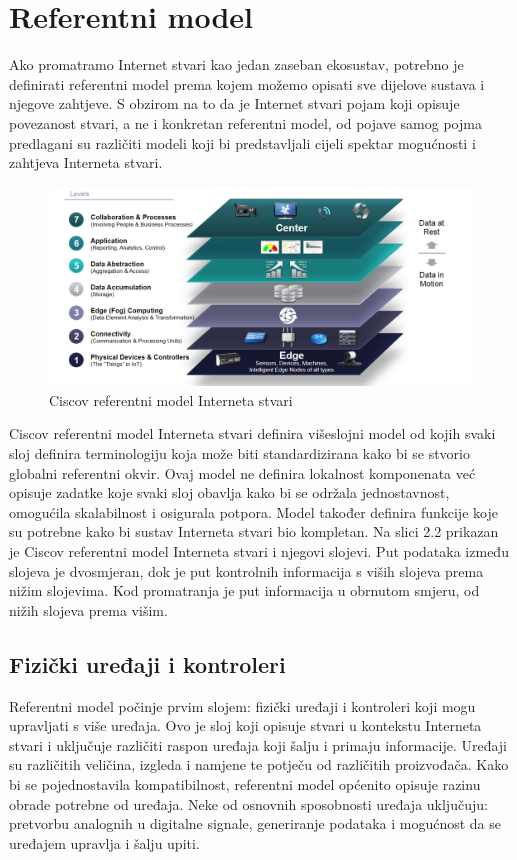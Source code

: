 \documentclass[times, utf8, diplomski]{fer}
\begin{document}
\section{Referentni model}
Ako promatramo Internet stvari kao jedan zaseban ekosustav, potrebno je definirati referentni model prema kojem možemo opisati sve dijelove sustava i njegove zahtjeve. S obzirom na to da je Internet stvari pojam koji opisuje povezanost stvari, a ne i konkretan referentni model, od pojave samog pojma predlagani su različiti modeli koji bi predstavljali cijeli spektar mogućnosti i zahtjeva Interneta stvari. 
\begin{figure}[htb]
    \centering
    \includegraphics[width=14cm]{images/ciscomodel.png}
    \caption{Ciscov referentni model Interneta stvari\citep{CiscoIotModel}}
    \label{fig:ciscomodel}
\end{figure}

Ciscov referentni model Interneta stvari\citep{CiscoIotModel} definira višeslojni model od kojih svaki sloj definira terminologiju koja može biti standardizirana kako bi se stvorio globalni referentni okvir. Ovaj model ne definira lokalnost komponenata već opisuje zadatke koje svaki sloj obavlja kako bi se održala jednostavnost, omogućila skalabilnost i osigurala potpora. Model također definira funkcije koje su potrebne kako bi sustav Interneta stvari bio kompletan. Na slici 2.2 prikazan je Ciscov referentni model Interneta stvari i njegovi slojevi. Put podataka između slojeva je dvosmjeran, dok je put kontrolnih informacija s viših slojeva prema nižim slojevima. Kod promatranja je put informacija u obrnutom smjeru, od nižih slojeva prema višim. 

\subsection{Fizički uređaji i kontroleri}
Referentni model počinje prvim slojem: fizički uređaji i kontroleri koji mogu upravljati s više uređaja. Ovo je sloj koji opisuje stvari u kontekstu Interneta stvari i uključuje različiti raspon uređaja koji šalju i primaju informacije. Uređaji 
su različitih veličina, izgleda i namjene te potječu od različitih proizvođača. Kako bi se pojednostavila kompatibilnost, referentni model općenito opisuje razinu obrade potrebne od uređaja. Neke od osnovnih sposobnosti uređaja uključuju: pretvorbu analognih u digitalne signale, generiranje podataka i mogućnost da se uređajem upravlja i šalju upiti.
\end{document}
